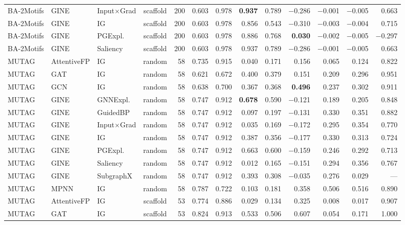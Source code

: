 \begin{table}[t]
{\begin{tabular}{lllcrrrrrrrrr}
BA-2Motifs & GINE & Input$\times$Grad & scaffold & 200 & 0.603 & 0.978 & \textbf{0.937} & 0.789 & $-$0.286 & $-$0.001 & $-$0.005 & 0.663 \\
BA-2Motifs & GINE & IG & scaffold & 200 & 0.603 & 0.978 & 0.856 & 0.543 & $-$0.310 & $-$0.003 & $-$0.004 & 0.715 \\
BA-2Motifs & GINE & PGExpl. & scaffold & 200 & 0.603 & 0.978 & 0.886 & 0.768 & \textbf{0.030} & $-$0.002 & $-$0.005 & $-$0.297 \\
BA-2Motifs & GINE & Saliency & scaffold & 200 & 0.603 & 0.978 & 0.937 & 0.789 & $-$0.286 & $-$0.001 & $-$0.005 & 0.663 \\
\addlinespace[2pt]
MUTAG & AttentiveFP & IG & random & 58 & 0.735 & 0.915 & 0.040 & 0.171 & 0.156 & 0.065 & 0.124 & 0.822 \\
MUTAG & GAT & IG & random & 58 & 0.621 & 0.672 & 0.400 & 0.379 & 0.151 & 0.209 & 0.296 & 0.951 \\
MUTAG & GCN & IG & random & 58 & 0.638 & 0.700 & 0.367 & 0.368 & \textbf{0.496} & 0.237 & 0.302 & 0.911 \\
MUTAG & GINE & GNNExpl. & random & 58 & 0.747 & 0.912 & \textbf{0.678} & 0.590 & $-$0.121 & 0.189 & 0.205 & 0.848 \\
MUTAG & GINE & GuidedBP & random & 58 & 0.747 & 0.912 & 0.097 & 0.197 & $-$0.131 & 0.330 & 0.351 & 0.882 \\
MUTAG & GINE & Input$\times$Grad & random & 58 & 0.747 & 0.912 & 0.035 & 0.169 & $-$0.172 & 0.295 & 0.354 & 0.770 \\
MUTAG & GINE & IG & random & 58 & 0.747 & 0.912 & 0.387 & 0.356 & $-$0.177 & 0.330 & 0.313 & 0.724 \\
MUTAG & GINE & PGExpl. & random & 58 & 0.747 & 0.912 & 0.663 & 0.600 & $-$0.159 & 0.246 & 0.292 & 0.713 \\
MUTAG & GINE & Saliency & random & 58 & 0.747 & 0.912 & 0.012 & 0.165 & $-$0.151 & 0.294 & 0.356 & 0.767 \\
MUTAG & GINE & SubgraphX & random & 58 & 0.747 & 0.912 & 0.393 & 0.308 & $-$0.035 & 0.276 & 0.029 & --- \\
MUTAG & MPNN & IG & random & 58 & 0.787 & 0.722 & 0.103 & 0.181 & 0.358 & 0.506 & 0.516 & 0.890 \\
\addlinespace[2pt]
MUTAG & AttentiveFP & IG & scaffold & 53 & 0.774 & 0.886 & 0.029 & 0.134 & 0.325 & 0.008 & 0.017 & 0.907 \\
MUTAG & GAT & IG & scaffold & 53 & 0.824 & 0.913 & 0.533 & 0.506 & 0.607 & 0.054 & 0.171 & 1.000 \\

\end{tabular}}
\end{table}
